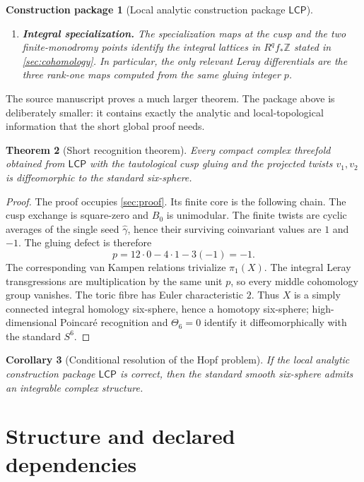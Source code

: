 \documentclass[11pt,reqno]{amsart}
\numberwithin{equation}{section}
\newcommand{\Z}{\mathbb Z}
\newcommand{\wideg}{\widehat\gamma}
\newcommand{\LCP}{\mathsf{LCP}}
\newtheorem{theorem}{Theorem}[section]
\newtheorem{corollary}[theorem]{Corollary}
\newtheorem{construction}[theorem]{Construction package}
\theoremstyle{definition}
\begin{document}
\begin{construction}[Local analytic construction package $\LCP$]
\begin{enumerate}[label=\textup{(L\arabic*)}]
\item \textbf{Integral specialization.} The specialization maps at the cusp and the two finite-monodromy points identify the integral lattices in $R^qf_*\Z$ stated in \cref{sec:cohomology}. In particular, the only relevant Leray differentials are the three rank-one maps computed from the same gluing integer $p$.
\end{enumerate}
\end{construction}

The source manuscript proves a much larger theorem. The package above is deliberately smaller: it contains exactly the analytic and local-topological information that the short global proof needs.

\begin{theorem}[Short recognition theorem]\label{thm:main}
Every compact complex threefold obtained from $\LCP$ with the tautological cusp gluing and the projected twists $v_1,v_2$ is diffeomorphic to the standard six-sphere.
\end{theorem}

\begin{proof}
The proof occupies \cref{sec:proof}. Its finite core is the following chain.
The cusp exchange is square-zero and $B_0$ is unimodular. The finite twists are cyclic averages of the single seed $\wideg$, hence their surviving coinvariant values are $1$ and $-1$. The gluing defect is therefore
\[
 p=12\cdot0-4\cdot1-3(-1)=-1.
\]
The corresponding van Kampen relations trivialize $\pi_1(X)$. The integral Leray transgressions are multiplication by the same unit $p$, so every middle cohomology group vanishes. The toric fibre has Euler characteristic $2$. Thus $X$ is a simply connected integral homology six-sphere, hence a homotopy six-sphere; high-dimensional Poincar\'e recognition and $\Theta_6=0$ identify it diffeomorphically with the standard $S^6$.
\end{proof}

\begin{corollary}[Conditional resolution of the Hopf problem]\label{cor:conditional}
If the local analytic construction package $\LCP$ is correct, then the standard smooth six-sphere admits an integrable complex structure.
\end{corollary}

\section{Structure and declared dependencies}\label{sec:dependencies}
\end{document}
